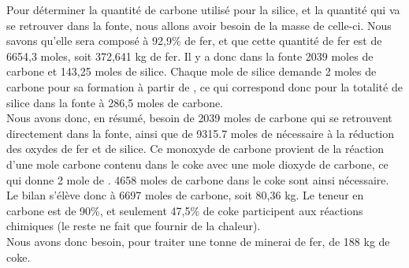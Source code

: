 \documentclass[11pt,a4paper]{report}
\begin{document}
Pour déterminer la quantité de carbone utilisé pour la silice, et la quantité qui va se retrouver dans la fonte, nous allons avoir besoin de la masse de celle-ci. Nous savons qu'elle sera composé à 92,9\% de fer, et que cette quantité de fer est de 6654,3 moles, soit 372,641 kg de fer. Il y a donc dans la fonte 2039 moles de carbone et 143,25 moles de silice. Chaque mole de silice demande 2 moles de carbone pour sa formation à partir de , ce qui correspond donc pour la totalité de silice dans la fonte à 286,5 moles de carbone.\\

Nous avons donc, en résumé, besoin de 2039 moles de carbone qui se retrouvent directement dans la fonte, ainsi que de 9315.7 moles de  nécessaire à la réduction des oxydes de fer et de silice. Ce monoxyde de carbone provient de la réaction d'une mole carbone contenu dans le coke avec une mole dioxyde de carbone, ce qui donne 2 mole de . 4658 moles de carbone dans le coke sont ainsi nécessaire. Le bilan s'élève donc à 6697 moles de carbone, soit 80,36 kg. Le teneur en carbone est de 90\%, et seulement  47,5\% de coke participent aux réactions chimiques (le reste ne fait que fournir de la chaleur). \\

Nous avons donc besoin, pour traiter une tonne de minerai de fer, de 188 kg de coke.


 
\end{document}

